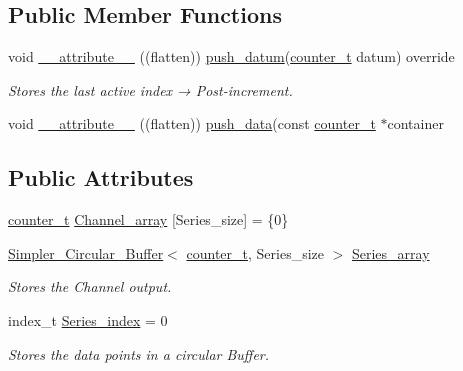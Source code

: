 \subsection*{Public Member Functions}
\begin{DoxyCompactItemize}
\item 
void \hyperlink{classLin__ACorr__RT__Teensy_ac07a3acf4e259aee8e5379b0dd327b6c}{\+\_\+\+\_\+attribute\+\_\+\+\_\+} ((flatten)) \hyperlink{classLin__ACorr__RT__Base_a398167525faf2a65f29722e943a0c57e}{push\+\_\+datum}(\hyperlink{types_8hpp_ac89ac912f524b3e3fa3720ea55fec966}{counter\+\_\+t} datum) override
\begin{DoxyCompactList}\small\item\em Stores the last active index → Post-\/increment. \end{DoxyCompactList}\item 
void \hyperlink{classLin__ACorr__RT__Teensy_a0bfee7278e28c759cca2497749aeecf7}{\+\_\+\+\_\+attribute\+\_\+\+\_\+} ((flatten)) \hyperlink{classLin__ACorr__RT__Base_a91c95a49619995f40aeae80916afed3e}{push\+\_\+data}(const \hyperlink{types_8hpp_ac89ac912f524b3e3fa3720ea55fec966}{counter\+\_\+t} $\ast$container
\end{DoxyCompactItemize}
\subsection*{Public Attributes}
\begin{DoxyCompactItemize}
\item 
\hyperlink{types_8hpp_ac89ac912f524b3e3fa3720ea55fec966}{counter\+\_\+t} \hyperlink{classLin__ACorr__RT__Teensy_af4dda93e07198bae54553a8f11773e74}{Channel\+\_\+array} \mbox{[}Series\+\_\+size\mbox{]} = \{0\}
\item 
\hyperlink{classSimpler__Circular__Buffer}{Simpler\+\_\+\+Circular\+\_\+\+Buffer}$<$ \hyperlink{types_8hpp_ac89ac912f524b3e3fa3720ea55fec966}{counter\+\_\+t}, Series\+\_\+size $>$ \hyperlink{classLin__ACorr__RT__Teensy_a9a619d1a74076f0bac8b7f03acebbb75}{Series\+\_\+array}
\begin{DoxyCompactList}\small\item\em Stores the Channel output. \end{DoxyCompactList}\item 
index\+\_\+t \hyperlink{classLin__ACorr__RT__Teensy_a495539383a4cab5ff611545361600599}{Series\+\_\+index} = 0
\begin{DoxyCompactList}\small\item\em Stores the data points in a circular Buffer. \end{DoxyCompactList}\end{DoxyCompactItemize}


